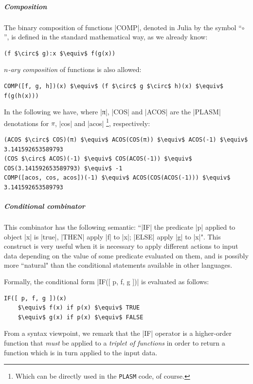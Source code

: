 \subparagraph{Composition}

The binary composition of functions |COMP|, denoted in Julia by the symbol 
``$\circ$”, is defined in the standard mathematical way, as we already know:
\begin{lstlisting}[language=JuliaLocal, style=julia, mathescape = true]
(f $\circ$ g):x $\equiv$ f(g(x))
\end{lstlisting}
\emph{$n$-ary composition} of functions is also allowed:
\begin{lstlisting}[language=JuliaLocal, style=julia, mathescape = true]
COMP([f, g, h])(x) $\equiv$ (f $\circ$ g $\circ$ h)(x) $\equiv$ f(g(h(x)))
\end{lstlisting}
In the following we have, where |π|, |COS| and
|ACOS| are the |PLASM| denotations for $\pi$, |cos| and
|acos| \footnote{Which can be directly used in the \texttt{PLASM} code, of course.}, respectively:
\begin{lstlisting}[language=JuliaLocal, style=julia, mathescape = true]
(ACOS $\circ$ COS)(π) $\equiv$ ACOS(COS(π)) $\equiv$ ACOS(-1) $\equiv$ 3.141592653589793
(COS $\circ$ ACOS)(-1) $\equiv$ COS(ACOS(-1)) $\equiv$ COS(3.141592653589793) $\equiv$ -1
COMP([acos, cos, acos])(-1) $\equiv$ ACOS(COS(ACOS(-1))) $\equiv$ 3.141592653589793
\end{lstlisting}



\subparagraph{Conditional combinator}

This combinator has the
following semantic: ``|IF| the predicate |p| applied to object 
|x| is |true|, |THEN| apply |f| to
|x|; |ELSE| apply |g| to |x|". 
This construct is very useful when it is necessary to apply different
actions to input data depending on the value of some predicate
evaluated on them, and is possibly more ``natural" than the
conditional statements available in other languages.  

Formally, the conditional form |IF([ p, f, g ])| is evaluated as follows: 
\begin{lstlisting}[language=JuliaLocal, style=julia, mathescape = true]
IF([ p, f, g ])(x) 
	$\equiv$ f(x) if p(x) $\equiv$ TRUE
	$\equiv$ g(x) if p(x) $\equiv$ FALSE
\end{lstlisting}

From a syntax viewpoint, we remark that the |IF| operator is
a higher-order function that \emph{must} be applied to a
\emph{triplet of functions} in order to return a function which is in
turn applied to the input data.

